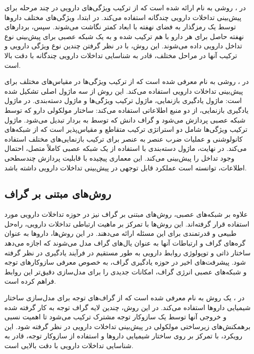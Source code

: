 در \cite{ref_lin2022}، روشی به نام  ارائه شده است که از ترکیب ویژگی‌های دارویی در چند مرحله برای پیش‌بینی تداخلات دارویی چندگانه استفاده می‌کند. در ابتدا، ویژگی‌های مختلف داروها توسط یک رمزگذار به فضای نهفته با ابعاد کمتر نگاشت می‌شوند. سپس، بردارهای نهفته حاصل برای هر دارو با هم ترکیب شده و به یک شبکه عصبی برای پیش‌بینی نوع تداخل دارویی داده می‌شوند. این روش، با در نظر گرفتن چندین نوع ویژگی دارویی و ترکیب آنها در مراحل مختلف، قادر به شناسایی تداخلات دارویی چندگانه با دقت بالا است.

در \cite{ref_muffin2021}، روشی به نام  معرفی شده است که از ترکیب ویژگی‌ها در مقیاس‌های مختلف برای پیش‌بینی تداخلات دارویی استفاده می‌کند. این روش از سه ماژول اصلی تشکیل شده است: ماژول یادگیری بازنمایی، ماژول ترکیب ویژگی‌ها و ماژول دسته‌بندی. در ماژول یادگیری بازنمایی،  از دو منبع اطلاعاتی استفاده می‌کند: ساختار مولکولی دارو که توسط شبکه عصبی  پردازش می‌شود و گراف دانش که توسط  به بردار تبدیل می‌شود. ماژول ترکیب ویژگی‌ها شامل دو استراتژی ترکیب متقاطع و مقیاس‌پذیر است که از شبکه‌های کانولوشنی و عملیات ضرب عنصر به عنصر برای ترکیب بازنمایی‌های مختلف استفاده می‌کند. در نهایت، ماژول دسته‌بندی با استفاده از یک شبکه عصبی کاملاً متصل، احتمال وجود تداخل را پیش‌بینی می‌کند. این معماری پیچیده با قابلیت پردازش چندسطحی اطلاعات، توانسته است عملکرد قابل توجهی در پیش‌بینی تداخلات دارویی داشته باشد.

\subsection{روش‌های مبتنی بر گراف}

علاوه بر شبکه‌های عصبی، روش‌های مبتنی بر گراف نیز در حوزه تداخلات دارویی مورد استفاده قرار گرفته‌اند. این روش‌ها با تمرکز بر ماهیت ارتباطی تداخلات دارویی، راه‌حل طبیعی و قدرتمندی برای این مسئله ارائه می‌دهند. در این روش‌ها، داروها به عنوان گره‌های گراف و ارتباطات آنها به عنوان یال‌های گراف مدل می‌شوند که اجازه می‌دهد ساختار ذاتی و توپولوژی روابط دارویی به طور مستقیم در فرآیند یادگیری در نظر گرفته شود. پیشرفت‌های اخیر در حوزه یادگیری گراف، به خصوص معرفی سازوکار‌های توجه و شبکه‌های عصبی انرژی گراف، امکانات جدیدی را برای مدل‌سازی دقیق‌تر این روابط فراهم کرده است.

در \cite{ref_nyamabo2021}، یک روش به نام  معرفی شده است که از گراف‌های توجه برای مدل‌سازی ساختار شیمیایی داروها استفاده می‌کند. در این روش، چندین لایه گراف توجه به کار گرفته شده و خروجی آنها توسط یک سازوکار توجه مشترک ترکیب می‌شود تا اهمیت نسبی برهمکنش‌های زیرساختی مولکولی در پیش‌بینی تداخلات دارویی در نظر گرفته شود. این رویکرد، با تمرکز بر روی ساختار شیمیایی داروها و استفاده از سازوکار توجه، قادر به شناسایی تداخلات دارویی با دقت بالایی است.

